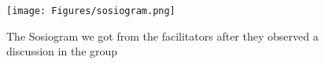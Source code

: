 
\begin{figure}
	\begin{center}
		\texttt{[image: Figures/sosiogram.png]}
	\end{center}
	\caption[The Sosiogram]{The Sosiogram we got from the facilitators after they observed a discussion in the group}
	\label{fig:sosiogram}
\end{figure}